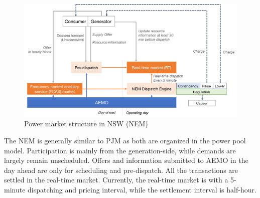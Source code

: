 \begin{figure}[h!]
	\centering
	\includegraphics[width=0.95\linewidth]{Figures/NSW_market-structure}
	\caption{Power market structure in NSW (NEM)}
	\label{fig:nsw-market-structure}
\end{figure}

The NEM is generally similar to PJM as both are organized in the power pool model. Participation is mainly from the generation-side, while demands are largely remain unscheduled. Offers and information submitted to AEMO in the day ahead are only for scheduling and pre-dispatch. All the transactions are settled in the real-time market. Currently, the real-time market is with a 5-minute dispatching and pricing interval, while the settlement interval is half-hour. 

